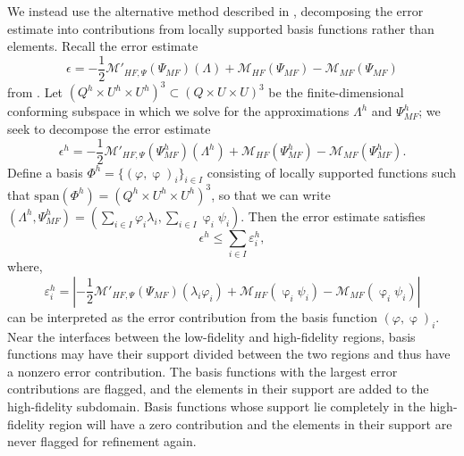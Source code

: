 We instead use the alternative method described in \cite{vanOpstaletal15}, decomposing the error estimate into contributions from locally supported basis functions rather than elements. Recall the error estimate 
%
\begin{equation}
\epsilon=-\frac{1}{2}\mathcal{M}'_{HF,\Psi}(\Psi_{MF})(\Lambda)+\mathcal M_{HF}(\Psi_{MF})-\mathcal M_{MF}(\Psi_{MF})
\end{equation}
%
from . Let $(Q^h\times U^h\times U^h)^3 \subset (Q\times U\times U)^3$ be the finite-dimensional conforming subspace in which we solve for the approximations $\Lambda^h$ and $\Psi_{MF}^h$; we seek to decompose the error estimate
%
\begin{equation}
\epsilon^h=-\frac{1}{2}\mathcal{M}'_{HF,\Psi}(\Psi_{MF}^h)(\Lambda^h)+\mathcal M_{HF}(\Psi_{MF}^h)-\mathcal M_{MF}(\Psi_{MF}^h).
\end{equation}
%
Define a basis $\Phi^h=\{(\varphi,\upvarphi)_i\}_{i\in I}$ consisting of locally supported functions such that $\textrm{span}(\Phi^h)=(Q^h\times U^h\times U^h)^3$, so that we can write $(\Lambda^h,\Psi_{MF}^h)=(\sum\limits_{i\in I}\varphi_i\lambda_i,\sum\limits_{i\in I}\upvarphi_i \psi_i)$. Then the error estimate satisfies
%
\begin{equation}
\epsilon^h \leq \sum_{i\in I} \varepsilon^h_i,
\end{equation}
%
where,
%
\begin{equation}\label{eq:basisblame}
\varepsilon^h_i = \left| -\frac{1}{2}\mathcal{M}'_{HF,\Psi}(\Psi_{MF})(\lambda_i\varphi_i)+\mathcal M_{HF}(\upvarphi_i \psi_i)-\mathcal M_{MF}(\upvarphi_i \psi_i) \right|
\end{equation}
%
can be interpreted as the error contribution from the basis function $(\varphi,\upvarphi)_i$. Near the interfaces between the low-fidelity and high-fidelity regions, basis functions may have their support divided between the two regions and thus have a nonzero error contribution. The basis functions with the largest error contributions are flagged, and the elements in their support are added to the high-fidelity subdomain. Basis functions whose support lie completely in the high-fidelity region will have a zero contribution and the elements in their support are never flagged for refinement again. 

